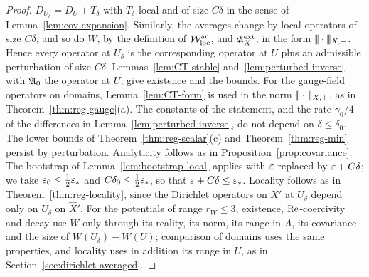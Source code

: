 \begin{proof}
$D_{U_\delta}=D_U+T_\delta$ with $T_\delta$ local and of size $C\delta$ in the sense of Lemma~\ref{lem:cov-expansion}. Similarly, the averages change by local operators of size $C\delta$, and so do $W$, by the definition of $\mathcal W^{\rm an}_{\rm loc}$, and $\mathfrak A^{\rm ext}_X$, in the form $|\!|\!|\cdot|\!|\!|_{X,+}$. Hence every operator at $U_\delta$ is the corresponding operator at $U$ plus an admissible perturbation of size $C\delta$. Lemmas~\ref{lem:CT-stable} and~\ref{lem:perturbed-inverse}, with $\mathfrak A_0$ the operator at $U$, give existence and the bounds. For the gauge-field operators on domains, Lemma~\ref{lem:CT-form} is used in the norm $|\!|\!|\cdot|\!|\!|_{X,+}$, as in Theorem~\ref{thm:reg-gauge}(a). The constants of the statement, and the rate $\gamma_0/4$ of the differences in Lemma~\ref{lem:perturbed-inverse}, do not depend on $\delta\le\delta_0$. The lower bounds of Theorem~\ref{thm:reg-scalar}(c) and Theorem~\ref{thm:reg-min} persist by perturbation. Analyticity follows as in Proposition~\ref{prop:covariance}. The bootstrap of Lemma~\ref{lem:bootstrap-local} applies with $\varepsilon$ replaced by $\varepsilon+C\delta$; we take $\varepsilon_0\le\frac12\varepsilon_*$ and $C\delta_0\le\frac12\varepsilon_*$, so that $\varepsilon+C\delta\le\varepsilon_*$. Locality follows as in Theorem~\ref{thm:reg-locality}, since the Dirichlet operators on $X'$ at $U_\delta$ depend only on $U_\delta$ on $\hat X'$. For the potentials of range $r_W\le3$, existence, $\operatorname{Re}$-coercivity and decay use $W$ only through its reality, its norm, its range in $A$, its covariance and the size of $W(U_\delta)-W(U)$; comparison of domains uses the same properties, and locality uses in addition its range in $U$, as in Section~\ref{sec:dirichlet-averaged}.
\end{proof}



